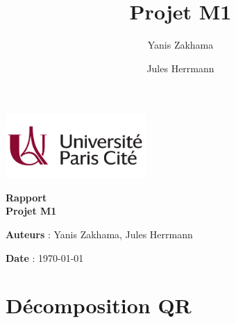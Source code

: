 \documentclass{article}
\title{Projet M1}
\author{Yanis Zakhama}
\author{Jules Herrmann}
\begin{document}
\begin{titlepage}
\hspace{0pt}
    
\begin{center}
\includegraphics[width=0.4\textwidth]{fig/logo-UP.png}\\[0.1in]

\vspace{.2in}

\Large \textbf {Rapport}\\[0.7in]
\Large \textbf {Projet M1}\\[0.7in]
\end{center}

\vspace{.2in}
\textbf{Auteurs} : Yanis Zakhama, Jules Herrmann

\textbf{Date} : \today

\vspace{.3in}

\vfill
\hspace{0pt}
\end{titlepage}
\cleardoublepage

\tableofcontents

\section{Décomposition QR}

\cite[p.~254]{bjorck_numerical_2015}


\cleardoublepage


\end{document}
